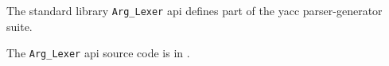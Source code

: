 
The standard library {\tt Arg\_Lexer} api defines part of the yacc parser-generator suite.

The {\tt Arg\_Lexer} api source code is in .
